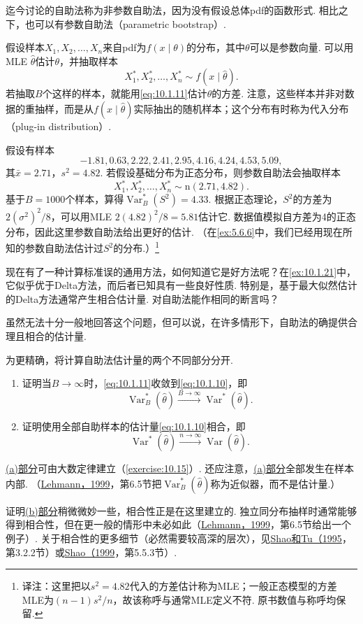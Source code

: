 迄今讨论的自助法称为非参数自助法，因为没有假设总体pdf的函数形式. 相比之下，也可以有参数自助法（parametric bootstrap）.

假设样本$X_1,X_2,\ldots,X_n$来自pdf为$f(x\mid\theta)$的分布，其中$\theta$可以是参数向量. 可以用MLE $\hat\theta$估计$\theta$，并抽取样本
$$X_1^*,X_2^*,\ldots,X_n^*\sim f(x\mid\hat\theta).$$
若抽取$B$个这样的样本，就能用\eqref{eq:10.1.11}估计$\hat\theta$的方差. 注意，这些样本并非对数据的重抽样，而是从$f(x\mid\hat\theta)$实际抽出的随机样本；这个分布有时称为代入分布（plug-in distribution）.

\begin{example}[参数自助法]\label{ex:10.1.22}
假设有样本
$$-1.81,0.63,2.22,2.41,2.95,4.16,4.24,4.53,5.09,$$
其$\bar x=2.71$，$s^2=4.82$. 若假设基础分布为正态分布，则参数自助法会抽取样本
$$X_1^*,X_2^*,\ldots,X_n^*\sim\mathrm n(2.71,4.82).$$
基于$B=1000$个样本，算得$\operatorname{Var}_B^*(S^2)=4.33$. 根据正态理论，$S^2$的方差为$2(\sigma^2)^2/8$，可以用MLE $2(4.82)^2/8=5.81$估计它. 数据值模拟自方差为4的正态分布，因此这里参数自助法给出更好的估计. （在\autoref{ex:5.6.6}中，我们已经用现在所知的参数自助法估计过$S^2$的分布.）\footnote{译注：这里把以$s^2=4.82$代入的方差估计称为MLE；一般正态模型的方差MLE为$(n-1)s^2/n$，故该称呼与通常MLE定义不符. 原书数值与称呼均保留.}
\end{example}

现在有了一种计算标准误的通用方法，如何知道它是好方法呢？在\autoref{ex:10.1.21}中，它似乎优于Delta方法，而后者已知具有一些良好性质. 特别是，基于最大似然估计的Delta方法通常产生相合估计量. 对自助法能作相同的断言吗？

虽然无法十分一般地回答这个问题，但可以说，在许多情形下，自助法的确提供合理且相合的估计量.

为更精确，将计算自助法估计量的两个不同部分分开.
\begin{enumerate}[label=\alph*.]
\item\label{item:10.1.bootstrap.a} 证明当$B\to\infty$时，\eqref{eq:10.1.11}收敛到\eqref{eq:10.1.10}，即
$$\operatorname{Var}_B^*(\hat\theta)\xrightarrow{B\to\infty}\operatorname{Var}^*(\hat\theta).$$
\item\label{item:10.1.bootstrap.b} 证明使用全部自助样本的估计量\eqref{eq:10.1.10}相合，即
$$\operatorname{Var}^*(\hat\theta)\xrightarrow{n\to\infty}\operatorname{Var}(\hat\theta).$$
\end{enumerate}
\hyperref[item:10.1.bootstrap.a]{(a)部分}可由大数定律建立（\autoref{exercise:10.15}）. 还应注意，\hyperref[item:10.1.bootstrap.a]{(a)部分}全部发生在样本内部. （\hyperref[bib:source199]{Lehmann，1999}，第6.5节把$\operatorname{Var}_B^*(\hat\theta)$称为近似器，而不是估计量.）

证明\hyperref[item:10.1.bootstrap.b]{(b)部分}稍微微妙一些，相合性正是在这里建立的. 独立同分布抽样时通常能够得到相合性，但在更一般的情形中未必如此（\hyperref[bib:source199]{Lehmann，1999}，第6.5节给出一个例子）. 关于相合性的更多细节（必然需要较高深的层次），见\hyperref[bib:source288]{Shao和Tu（1995}，第3.2.2节）或\hyperref[bib:source287]{Shao（1999}，第5.5.3节）.
